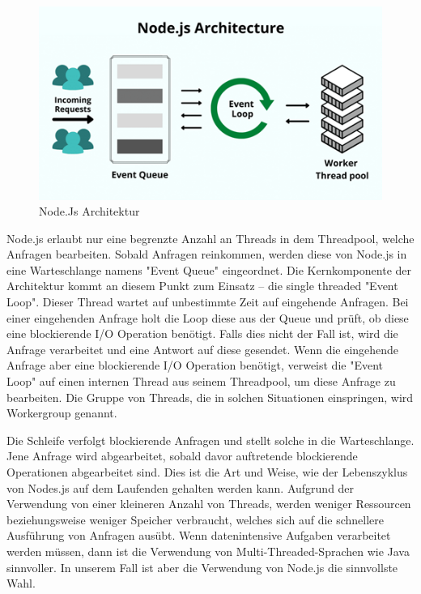 \begin{figure}[H]
    \centering
    \includegraphics{media/NodeJs/NodeJsArchitektur.png}
    \caption{Node.Js Architektur}
\end{figure}


Node.js erlaubt nur eine begrenzte Anzahl an Threads in dem Threadpool, welche Anfragen bearbeiten.
Sobald Anfragen reinkommen, werden diese von Node.js in eine Warteschlange namens "Event Queue" eingeordnet. 
Die Kernkomponente der Architektur kommt an diesem Punkt zum Einsatz – die single threaded "Event Loop". Dieser Thread wartet auf unbestimmte Zeit auf eingehende Anfragen.
Bei einer eingehenden Anfrage holt die Loop diese aus der Queue und prüft, ob diese eine blockierende I/O Operation benötigt. Falls dies nicht der Fall ist, wird die Anfrage verarbeitet und eine Antwort auf diese gesendet. 
Wenn die eingehende Anfrage aber eine blockierende I/O Operation benötigt, verweist die "Event Loop" auf einen internen Thread aus seinem Threadpool, um diese Anfrage zu bearbeiten. Die Gruppe von Threads, die in solchen Situationen einspringen, wird Workergroup genannt.



Die Schleife verfolgt blockierende Anfragen und stellt solche in die Warteschlange. Jene Anfrage wird abgearbeitet, sobald davor auftretende blockierende Operationen abgearbeitet sind. Dies ist die Art und Weise, wie der Lebenszyklus von Nodes.js auf dem Laufenden gehalten werden kann.
Aufgrund der Verwendung von einer kleineren Anzahl von Threads, werden weniger Ressourcen beziehungsweise weniger Speicher verbraucht, welches sich auf die schnellere Ausführung von Anfragen ausübt. Wenn datenintensive Aufgaben verarbeitet werden müssen, dann ist die Verwendung von Multi-Threaded-Sprachen wie Java sinnvoller. In unserem Fall ist aber die Verwendung von Node.js die sinnvollste Wahl. \cite{Arocom}


